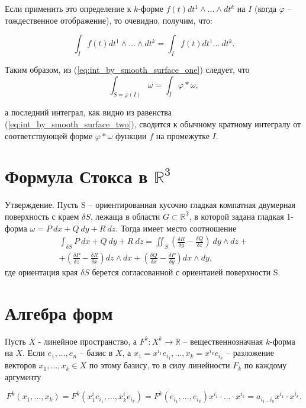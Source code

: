 \documentclass[a4paper, 12pt]{article} %
\begin{document}
Если применить это определение к $k$-форме $f(t) dt^1 \land ...\land dt^k$ на $I$ (когда $\varphi$ -- тождественное отображение), то очевидно, получим, что:

\[
    \int_I f(t) dt^1 \land ... \land dt^k = \int_I f(t) dt^1 ... \ dt^k.
    \label{eq:int_by_smooth_surface_two}
\]

Таким образом, из (\ref{eq:int_by_smooth_surface_one}) следует, что
\begin{equation}
    \int_{S = \varphi(I)} \omega = \int_I \varphi * \omega,
\end{equation}

а последний интеграл, как видно из равенства (\ref{eq:int_by_smooth_surface_two}), сводится к обычному кратному интегралу от соответствующей форме $\varphi * \omega$ функции $f$ на промежутке $I$.

\clearpage
\section*{Формула Стокса в $\mathbb{R}^3$}
Утверждение. Пусть S -- ориентированная кусочно гладкая компатная двумерная поверхность с краем $\delta S$, лежаща в области $G \subset \mathbb{R^3}$, в которой задана гладкая 1-форма $\omega = P\ dx + Q\ dy + R\ dz$. Тогда имеет место соотношение
\begin{eqnarray*}
    \int_{\delta S} P\ dx + Q\ dy + R\ dz = \iint_S \left( \frac{\delta R}{\delta y} - \frac{\delta Q}{\delta z} \right) \ dy \land dz + \\ + \left(\frac{\delta P}{\delta z} - \frac{\delta R}{\delta x}\right) dz \land dx + \left(\frac{\delta Q}{\delta x} - \frac{\delta P}{\delta y}\right) dx \land dy,
\end{eqnarray*}
где ориентация края $\delta S$ берется согласованной с ориентаией поверхности S.

\clearpage

\section*{Алгебра форм}
Пусть $X$ - линейное пространство, а $F^k : X^k \to \mathbb{R}$ -- вещественнозначная $k$-форма на $X$. Если $e_1, ..., e_n$ -- базис в $X$, а $x_1 = x^{i_1} e_{i_1}, ..., x_k = x^{i_k} e_{i_k}$ -- разложение векторов $x_1, ..., x_k \in X$ по этому базису, то в силу линейности $F_k$ по каждому аргументу

\begin{equation}
    F^k(x_1,...,x_k) = F^k(x^i_1 e_{i_1}, ..., x^i_k e_{i_k}) = F^k(e_{i_1}, ..., e_{i_k}) x^{i_1} \cdot  ... \cdot x^{i_k} = a_{i_1 ... i_k} x^{i_1} \cdot x^{i_k}.
\end{equation}
\end{document}
